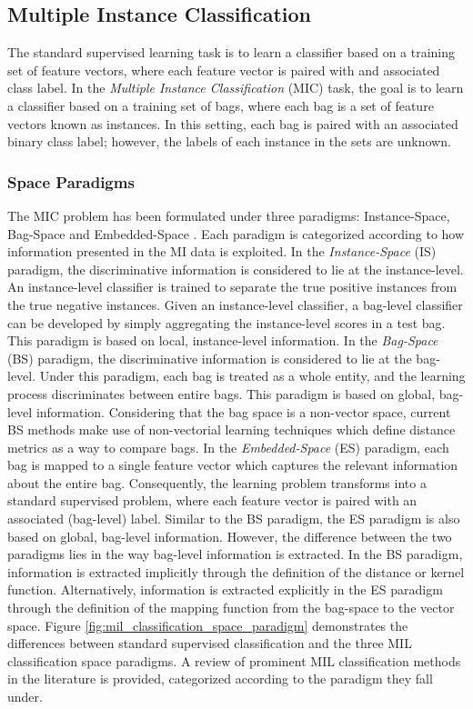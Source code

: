 \subsection{Multiple Instance Classification}
The standard supervised learning task is to learn a classifier based on a training set of feature vectors, where each feature vector is paired with and associated class label.  In the \textit{Multiple Instance Classification} (MIC) task, the goal is to learn a classifier based on a training set of bags, where each bag is a set of feature vectors known as instances.  In this setting, each bag is paired with an associated binary class label; however, the labels of each instance in the sets are unknown. 
\subsubsection{Space Paradigms} The MIC problem has been formulated under three paradigms: Instance-Space, Bag-Space and Embedded-Space \citep{Amores2013MIClassification}.  Each paradigm is categorized according to how information presented in the MI data is exploited.  In the \textit{Instance-Space} (IS) paradigm, the discriminative information is considered to lie at the instance-level.  An instance-level classifier is trained to separate the true positive instances from the true negative instances.  Given an instance-level classifier, a bag-level classifier can be developed by simply aggregating the instance-level scores in a test bag.  This paradigm is based on local, instance-level information.  In the \textit{Bag-Space} (BS) paradigm, the discriminative information is considered to lie at the bag-level.  Under this paradigm, each bag is treated as a whole entity, and the learning process discriminates between entire bags.  This paradigm is based on global, bag-level information.  Considering that the bag space is a non-vector space, current BS methods make use of non-vectorial learning techniques which define distance metrics as a way to compare bags.  In the \textit{Embedded-Space} (ES) paradigm, each bag is mapped to a single feature vector which captures the relevant information about the entire bag.  Consequently, the learning problem transforms into a standard supervised problem, where each feature vector is paired with an associated (bag-level) label.  Similar to the BS paradigm, the ES paradigm is also based on global, bag-level information.  However, the difference between the two paradigms lies in the way bag-level information is extracted.  In the BS paradigm, information is extracted implicitly through the definition of the distance or kernel function.  Alternatively, information is extracted explicitly in the ES paradigm through the definition of the mapping function from the bag-space to the vector space.  Figure \ref{fig:mil_classification_space_paradigm} demonstrates the differences between standard supervised classification and the three MIL classification space paradigms.  A review of prominent MIL classification methods in the literature is provided, categorized according to the paradigm they fall under.

